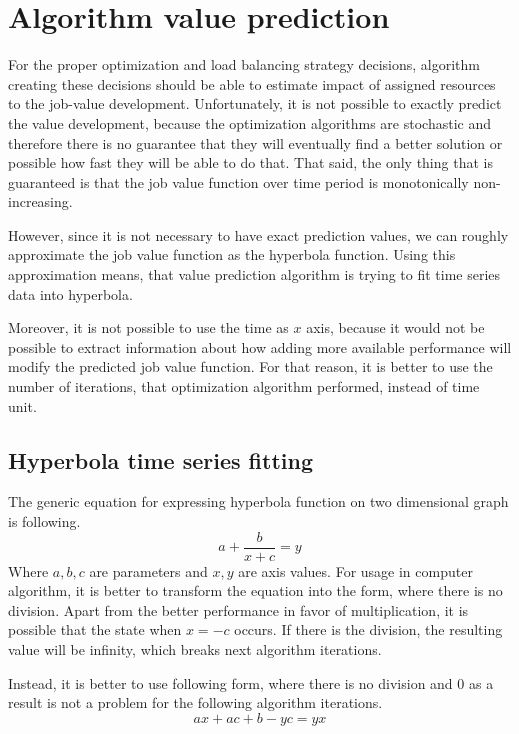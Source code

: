 \section{Algorithm value prediction}\label{sec:algorithm-value-prediction}

For the proper optimization and load balancing strategy decisions,
algorithm creating these decisions should be able to estimate impact of assigned resources to the job-value development.
Unfortunately, 
it is not possible to exactly predict the value development,
because the optimization algorithms are stochastic 
and therefore there is no guarantee that they will eventually find a better solution
or possible how fast they will be able to do that.
That said, 
the only thing that is guaranteed is that the job value function over time period is monotonically non-increasing.

However,
since it is not necessary to have exact prediction values,
we can roughly approximate the job value function as the hyperbola function.
Using this approximation means,
that value prediction algorithm is trying to fit time series data into hyperbola.

Moreover, 
it is not possible to use the time as $x$ axis,
because it would not be possible to extract information about 
how adding more available performance will modify the predicted job value function.
For that reason,
it is better to use the number of iterations, that optimization algorithm performed,
instead of time unit.

\subsection{Hyperbola time series fitting}
The generic equation for expressing hyperbola function on two dimensional graph is following.
\begin{equation}
    a + \dfrac{b}{x+c} = y
\end{equation}
Where $a,b,c$ are parameters and $x,y$ are axis values.
For usage in computer algorithm,
it is better to transform the equation into the form, 
where there is no division.
Apart from the better performance in favor of multiplication\cite{LeFevre1999},
it is possible that the state when $x = -c$ occurs.
If there is the division,
the resulting value will be infinity,
which breaks next algorithm iterations.

Instead,
it is better to use following form, 
where there is no division and $0$ as a result is not a problem for the following algorithm iterations.
\begin{equation}\label{eq:final-hyperbola-fc}
    ax + ac + b - yc = yx
\end{equation}

